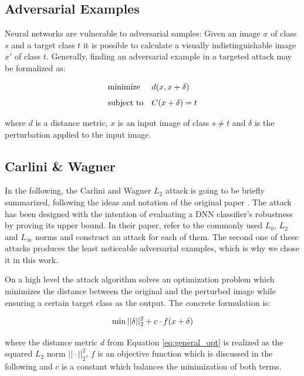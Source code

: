 \subsection{Adversarial Examples}

Neural networks are vulnerable to adversarial samples: Given an image $x$ of class $s$ and a target class $t$ it is possible to calculate a visually indistinguishable image $x'$ of class $t$. Generally, finding an adversarial example in a targeted attack may be formalized as:

\begin{equation}
\label{eq:general_opt}
\begin{aligned} & \underset{}{\text{minimize}} & & d(x, x+\delta) \\ & \text{subject to} & & C(x + \delta) = t \end{aligned}
\end{equation}

where $d$ is a distance metric, $x$ is an input image of class $s \neq t$ and $\delta$ is the perturbation applied to the input image.

\subsection{Carlini \& Wagner}\label{subsec:cwl2}
In the following, the Carlini and Wagner $L_2$ attack is going to be briefly summarized, following the ideas and notation of the original paper \cite{carlini2017towards}.
The attack has been designed with the intention of evaluating a DNN classifier's robustness by proving its upper bound.
In their paper, \citeauthor{carlini2017towards} refer to the commonly used $L_0$, $L_2$ and $L_\infty$ norms and construct an attack for each of them.
The second one of these attacks produces the least noticeable adversarial examples, which is why we chose it in this work.

On a high level the attack algorithm solves an optimization problem which minimizes the distance between the original and the perturbed image while ensuring a certain target class as the output. The concrete formulation is:

\begin{equation}\label{eq:cw_general}
\min ||\delta||^2_2 + c \cdot f(x + \delta)
\vspace{1ex}
\end{equation}

where the distance metric $d$ from Equation \ref{eq:general_opt} is realized as the squared $L_2$ norm $||\cdot||^2_2$, $f$ is an objective function which is discussed in the following and $c$ is a constant which balances the minimization of both terms.

